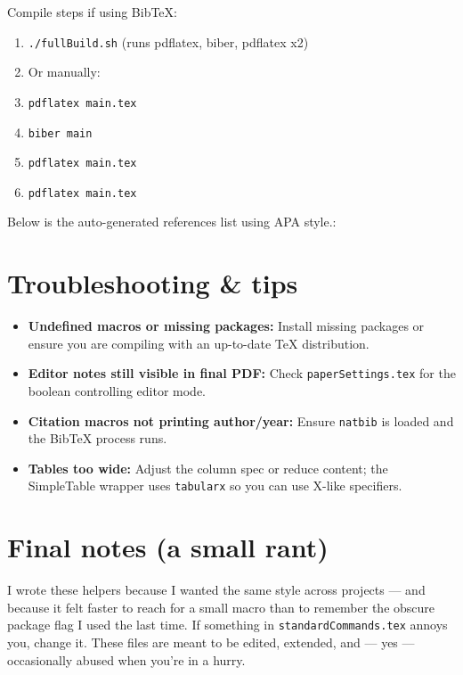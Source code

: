 \documentclass[nonacm, sigconf, balance=true]{acmart}
\begin{document}
    Compile steps if using BibTeX:
    \begin{enumerate}
        \item \verb|./fullBuild.sh| (runs pdflatex, biber, pdflatex x2)
        \item[] Or manually:
        \item \verb|pdflatex main.tex|
        \item \verb|biber main|
        \item \verb|pdflatex main.tex|
        \item \verb|pdflatex main.tex|
    \end{enumerate}

    Below is the auto-generated references list using APA style.:
    \printbibliography




    \section{Troubleshooting \& tips}
    \begin{itemize}
        \item \textbf{Undefined macros or missing packages:} Install missing packages or ensure you are compiling with an up-to-date TeX distribution.
        \item \textbf{Editor notes still visible in final PDF:} Check \texttt{paperSettings.tex} for the boolean controlling editor mode.
        \item \textbf{Citation macros not printing author/year:} Ensure \texttt{natbib} is loaded and the BibTeX process runs.
        \item \textbf{Tables too wide:} Adjust the column spec or reduce content; the SimpleTable wrapper uses \texttt{tabularx} so you can use X-like specifiers.
    \end{itemize}



    \section{Final notes (a small rant)}
    I wrote these helpers because I wanted the same style across projects — and because it felt faster to reach for a small macro than to remember the obscure package flag I used the last time. If something in \texttt{standardCommands.tex} annoys you, change it. These files are meant to be edited, extended, and — yes — occasionally abused when you're in a hurry.
\end{document}
